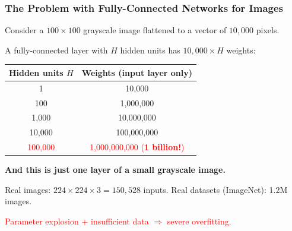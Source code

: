 \documentclass[notes,11pt, aspectratio=169]{beamer}
\begin{document}
\begin{frame}
\frametitle{The Problem with Fully-Connected Networks for Images}

Consider a $100 \times 100$ grayscale image flattened to a vector of $10{,}000$ pixels.

\vspace{4pt}
A fully-connected layer with $H$ hidden units has $10{,}000 \times H$ weights:

\renewcommand{\arraystretch}{1.3}
\begin{center}
{\small
\begin{tabular}{cc}
\toprule
\textbf{Hidden units} $H$ & \textbf{Weights} (input layer only) \\
\midrule
1 & 10,000 \\
100 & 1,000,000 \\
1,000 & 10,000,000 \\
10,000 & 100,000,000 \\
\textcolor{red}{100,000} & \textcolor{red}{1,000,000,000 (\textbf{1 billion!})} \\
\bottomrule
\end{tabular}
}
\end{center}

\vspace{6pt}
\textbf{And this is just one layer of a small grayscale image.}

\vspace{4pt}
Real images: $224 \times 224 \times 3 = 150{,}528$ inputs. Real datasets (ImageNet): 1.2M images.

\vspace{4pt}
\textcolor{red}{Parameter explosion + insufficient data $\Rightarrow$ severe overfitting.}
\end{frame}
\end{document}
